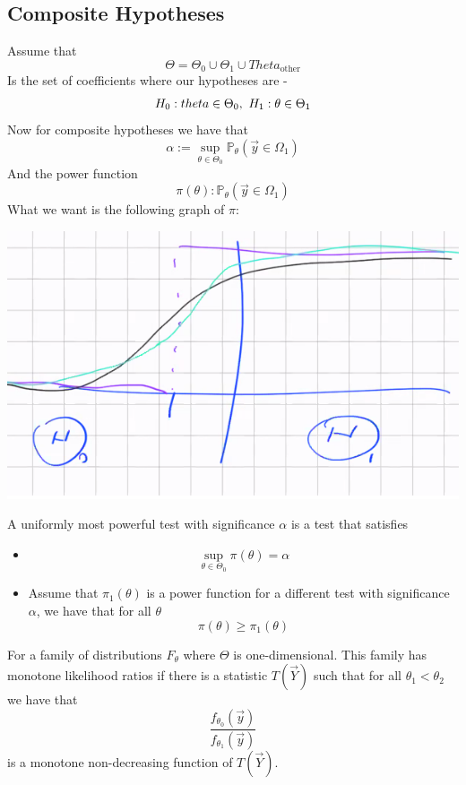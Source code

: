 \documentclass[../main.tex]{subfiles}
\begin{document}
\subsection{Composite Hypotheses}
Assume that
\[\Theta = \Theta_0\cup \Theta_1\cup Theta_{\text{other}}\]
Is the set of coefficients where our hypotheses are - 
\[H_0:\text{} \\theta\in\Theta_0,\text{ } H_1: \theta\in\Theta_1\]
Now for composite hypotheses we have that 
\[\alpha:=\sup_{\theta\in\Theta_0}\mathbb{P}_{\theta}(\overrightarrow{y}\in\Omega_1)\]
And the power function
\[\pi(\theta):\mathbb{P}_{\theta}(\overrightarrow{y}\in\Omega_1)\] 
What we want is the following graph of $\pi$:
\begin{center}
    \includegraphics[scale=0.7]{images/Stat_Theory_Lecture_!3.png}
\end{center}
\begin{definition}
A uniformly most powerful test with significance $\alpha$ is a test that satisfies
\begin{itemize}
    \item \[\sup_{\theta\in\Theta_0}\pi(\theta)=\alpha\]
    \item Assume that $\pi_1(\theta)$ is a power function for a different test with significance $\alpha$, we have that for all $\theta$
    \[\pi(\theta)\geq\pi_1(\theta)\]
\end{itemize}
\end{definition}
\newpage
\begin{definition}
For a family of distributions $F_{\theta}$ where $\Theta$ is one-dimensional. This family has monotone likelihood ratios if there is a statistic $T(\overrightarrow{Y})$ such that for all $\theta_1<\theta_2$ we have that
\[\frac{f_{\theta_0}(\overrightarrow{y})}{f_{\theta_1}(\overrightarrow{y})}\]
is a monotone non-decreasing function of $T(\overrightarrow{Y})$. 
\end{definition}
\end{document}

